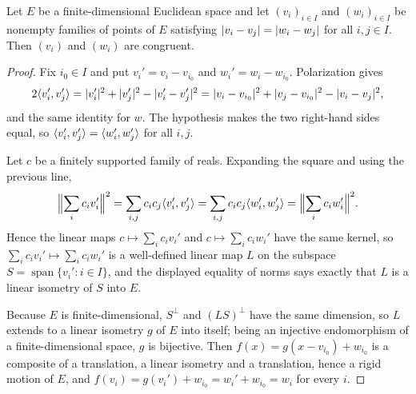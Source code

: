 \begin{lemma}
\label{lem:isometry-extension}
\leanok
Let $E$ be a finite-dimensional Euclidean space and let $(v_i)_{i\in I}$ and $(w_i)_{i\in I}$ be
nonempty families of points of $E$ satisfying $\lvert v_i-v_j \rvert = \lvert w_i-w_j \rvert$ for all $i,j\in I$.
Then $(v_i)$ and $(w_i)$ are congruent.
\end{lemma}
\begin{proof}
Fix $i_0\in I$ and put $v_i' = v_i - v_{i_0}$ and $w_i' = w_i - w_{i_0}$. Polarization gives
\[
2\langle v_i', v_j' \rangle = \lvert v_i' \rvert^2 + \lvert v_j' \rvert^2 - \lvert v_i'-v_j' \rvert^2
 = \lvert v_i-v_{i_0} \rvert^2 + \lvert v_j-v_{i_0} \rvert^2 - \lvert v_i-v_j \rvert^2,
\]
and the same identity for $w$. The hypothesis makes the two right-hand sides equal, so
$\langle v_i', v_j' \rangle = \langle w_i', w_j' \rangle$ for all $i,j$.

Let $c$ be a finitely supported family of reals. Expanding the square and using the previous line,
\[
\Bigl\lVert \sum_i c_i v_i' \Bigr\rVert^2 = \sum_{i,j} c_i c_j \langle v_i', v_j' \rangle
 = \sum_{i,j} c_i c_j \langle w_i', w_j' \rangle = \Bigl\lVert \sum_i c_i w_i' \Bigr\rVert^2 .
\]
Hence the linear maps $c\mapsto \sum_i c_i v_i'$ and $c\mapsto \sum_i c_i w_i'$ have the same kernel,
so $\sum_i c_i v_i' \mapsto \sum_i c_i w_i'$ is a well-defined linear map $L$ on the subspace
$S = \operatorname{span}\{v_i' : i\in I\}$, and the displayed equality of norms says exactly that $L$
is a linear isometry of $S$ into $E$.

Because $E$ is finite-dimensional, $S^\perp$ and $(LS)^\perp$ have the same dimension, so $L$ extends
to a linear isometry $g$ of $E$ into itself; being an injective endomorphism of a finite-dimensional
space, $g$ is bijective. Then $f(x) = g(x - v_{i_0}) + w_{i_0}$ is a composite of a translation, a
linear isometry and a translation, hence a rigid motion of $E$, and
$f(v_i) = g(v_i') + w_{i_0} = w_i' + w_{i_0} = w_i$ for every $i$.
\end{proof}

